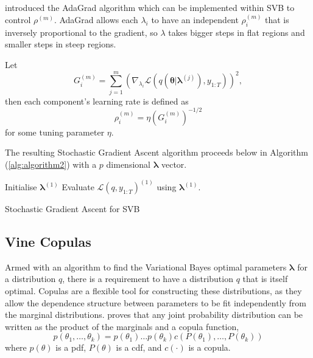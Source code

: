 \documentclass[12pt,a4paper]{article}%
\numberwithin{equation}{section}
\begin{document}
\citet{Duchi2011} introduced the AdaGrad algorithm which can be implemented within SVB to control $\rho^{(m)}$. AdaGrad allows each $\lambda_i$ to have an independent $\rho^{(m)}_i$ that is inversely proportional to the gradient, so $\lambda$ takes bigger steps in flat regions and smaller steps in steep regions. 

Let 
\begin{equation}
\label{SVB3}
G_i^{(m)} = \sum_{j = 1}^{m} \left(\nabla_{\lambda_i}\mathcal{L}(q(\boldsymbol{\theta} | \boldsymbol{\lambda}^{(j)}), y_{1:T})\right)^2,
\end{equation}
then each component's learning rate is defined as
\begin{equation}
\label{SVB4}
\rho^{(m)}_i = \eta \left(G_i^{(m)}\right)^{-1/2}
\end{equation}
for some tuning parameter $\eta$.

The resulting Stochastic Gradient Ascent algorithm proceeds below in Algorithm (\ref{alg:algorithm2}) with a $p$ dimensional $\boldsymbol{\lambda}$ vector.

\vspace{2mm}

\begin{algorithm}[H]
 Initialise $\boldsymbol{\lambda}^{(1)}$\;
 Evaluate $\mathcal{L}(q, y_{1:T})^{(1)}$ using $\boldsymbol{\lambda}^{(1)}$.\;
 \caption{Stochastic Gradient Ascent for SVB}
  \label{alg:algorithm2}
\end{algorithm}


\subsection{Vine Copulas} \label{sec:vines}

Armed with an algorithm to find the Variational Bayes optimal parameters $\boldsymbol{\lambda}$ for a distribution $q$, there is a requirement to have a distribution $q$ that is itself optimal. Copulas are a flexible tool for constructing these distributions, as they allow the dependence structure between parameters to be fit independently from the marginal distributions. \citet{Sklar1959} proves that any joint probability distribution can be written as the product of the marginals and a copula function,
\begin{equation}
\label{vc1}
p(\theta_1, \dots, \theta_k) = p(\theta_1) \dots p(\theta_k) c(P(\theta_1), \dots, P(\theta_k))
\end{equation}
where $p(\theta)$ is a pdf, $P(\theta)$ is a cdf, and $c(\cdot)$ is a copula. 
\end{document}
